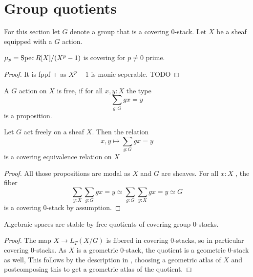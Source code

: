 \section{Group quotients}
For this section let $G$ denote a group that is a covering 0-stack. Let $X$ be a sheaf equipped with a $G$ action.
\begin{lemma}
	 $\mu_p = \operatorname{Spec} R[X] / (X^p - 1)$ is covering for $p \neq 0$ prime.
\end{lemma}
\begin{proof}
	It is fppf + \etale as $X^p - 1$ is monic seperable. TODO
\end{proof}
\begin{definition}
	A $G$ action on $X$ is free, if for all $x , y : X$ the type 
	\[
	\sum_{g: G} g x = y
	\]
	is a proposition. 
\end{definition}
\begin{lemma}
	Let $G$ act freely on a sheaf $X$. Then the relation
	\[
	x , y\mapsto \sum_{g : G} g x = y
	\]
	is a covering equivalence relation on $X$
\end{lemma}
\begin{proof}
	All those propositions are modal as $X$ and $G$ are sheaves. For all $x : X$ , the fiber
	\[
	\sum_{y : X} \sum_{g : G} g x = y \simeq \sum_{g : G} \sum_{y: X} g x = y \simeq G
	\]
	is a covering 0-stack by assumption.
\end{proof}
\begin{lemma}{\label{lemma:algSpacesStabFreeQuots}}
	Algebraic spaces are stable by free quotients of covering group 0-stacks.
\end{lemma}
\begin{proof}
	The map $ X \to L_T (X / G)$ is fibered in covering 0-stacks, so in particular covering $0$-stacks. As $X$ is a geometric $0$-stack, the quotient is a geometric $0$-stack as well, This follows by the description in \label{prop:nstack}, choosing a geometric atlas of $X$ and postcomposing this to get a geometric atlas of the quotient.
\end{proof}

%	

